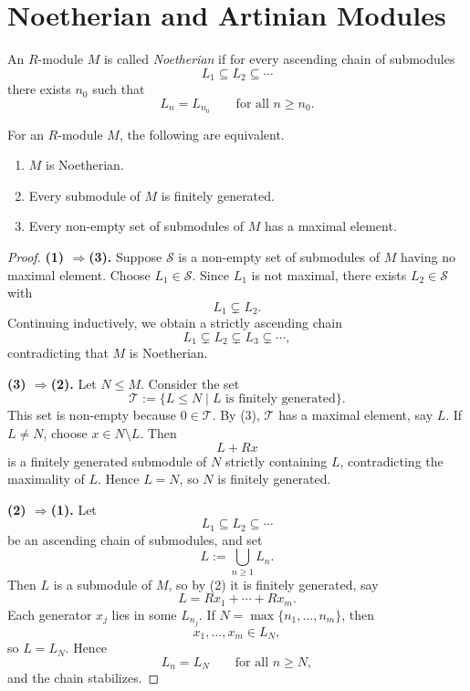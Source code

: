 \section{Noetherian and Artinian Modules}

\begin{definition}
    An $R$-module $M$ is called \emph{Noetherian} if for every ascending chain of submodules
    \[
        L_1\subseteq L_2\subseteq \cdots
    \]
    there exists $n_0$ such that
    \[
        L_n=L_{n_0}\qquad \text{for all } n\ge n_0.
    \]
\end{definition}

\begin{lemma}
    For an $R$-module $M$, the following are equivalent.
    \begin{enumerate}
        \item $M$ is Noetherian.
        \item Every submodule of $M$ is finitely generated.
        \item Every non-empty set of submodules of $M$ has a maximal element.
    \end{enumerate}
\end{lemma}

\begin{proof}
    \textbf{(1) $\Longrightarrow$(3).}
    Suppose $\mathcal{S}$ is a non-empty set of submodules of $M$ having no maximal element.
    Choose $L_1\in \mathcal{S}$. Since $L_1$ is not maximal, there exists $L_2\in \mathcal{S}$ with
    \[
        L_1\subsetneq L_2.
    \]
    Continuing inductively, we obtain a strictly ascending chain
    \[
        L_1\subsetneq L_2\subsetneq L_3\subsetneq \cdots,
    \]
    contradicting that $M$ is Noetherian.

    \textbf{(3) $\Longrightarrow$(2).}
    Let $N\le M$. Consider the set
    \[
        \mathcal{T}:=\{L\le N \mid L \text{ is finitely generated}\}.
    \]
    This set is non-empty because $0\in \mathcal{T}$. By (3), $\mathcal{T}$ has a maximal
    element, say $L$. If $L\neq N$, choose $x\in N\setminus L$. Then
    \[
        L+Rx
    \]
    is a finitely generated submodule of $N$ strictly containing $L$, contradicting the
    maximality of $L$. Hence $L=N$, so $N$ is finitely generated.

    \textbf{(2) $\Longrightarrow$(1).}
    Let
    \[
        L_1\subseteq L_2\subseteq \cdots
    \]
    be an ascending chain of submodules, and set
    \[
        L:=\bigcup_{n\ge 1} L_n.
    \]
    Then $L$ is a submodule of $M$, so by (2) it is finitely generated, say
    \[
        L=Rx_1+\cdots+Rx_m.
    \]
    Each generator $x_j$ lies in some $L_{n_j}$. If $N=\max\{n_1,\dots,n_m\}$, then
    \[
        x_1,\dots,x_m\in L_N,
    \]
    so $L=L_N$. Hence
    \[
        L_n=L_N \qquad \text{for all } n\ge N,
    \]
    and the chain stabilizes.
\end{proof}

